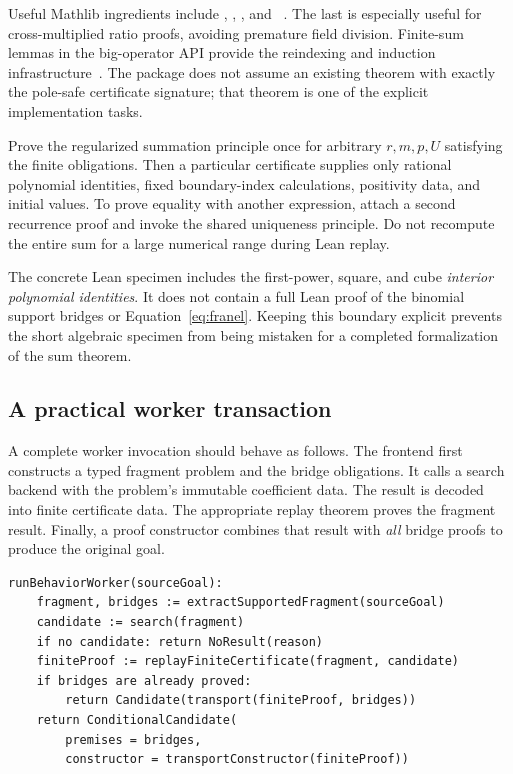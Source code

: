 Useful Mathlib ingredients include ,
, , and
~\cite{mathlib-choose}. The last is
especially useful for cross-multiplied ratio proofs, avoiding premature field
division. Finite-sum lemmas in the  big-operator API provide the
reindexing and induction infrastructure~\cite{mathlib-finset}. The package does
not assume an existing theorem with exactly the pole-safe certificate signature;
that theorem is one of the explicit implementation tasks.

Prove the regularized summation principle once for arbitrary $r,m,p,U$ satisfying
the finite obligations. Then a particular certificate supplies only rational
polynomial identities, fixed boundary-index calculations, positivity data, and
initial values. To prove equality with another expression, attach a second
recurrence proof and invoke the shared uniqueness principle. Do not recompute
the entire sum for a large numerical range during Lean replay.

The concrete Lean specimen includes the first-power, square, and cube
\emph{interior polynomial identities}. It does not contain a full Lean proof of
the binomial support bridges or Equation~\eqref{eq:franel}. Keeping this
boundary explicit prevents the short algebraic specimen from being mistaken
for a completed formalization of the sum theorem.

\subsection{A practical worker transaction}

A complete worker invocation should behave as follows. The frontend first
constructs a typed fragment problem and the bridge obligations. It calls a
search backend with the problem's immutable coefficient data. The result is
decoded into finite certificate data. The appropriate replay theorem proves
the fragment result. Finally, a proof constructor combines that result with
\emph{all} bridge proofs to produce the original goal.

\par\noindent\begin{minipage}{\linewidth}
\begin{lstlisting}
runBehaviorWorker(sourceGoal):
    fragment, bridges := extractSupportedFragment(sourceGoal)
    candidate := search(fragment)
    if no candidate: return NoResult(reason)
    finiteProof := replayFiniteCertificate(fragment, candidate)
    if bridges are already proved:
        return Candidate(transport(finiteProof, bridges))
    return ConditionalCandidate(
        premises = bridges,
        constructor = transportConstructor(finiteProof))
\end{lstlisting}
\end{minipage}\par

